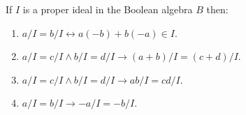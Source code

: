 If $I$ is a proper ideal in the Boolean algebra $B$ then:
\begin{enumerate}
\item $a/I = b/I \leftrightarrow a(-b) + b(-a) \in I$.
\item $a/I = c/I \land b/I = d/I \rightarrow (a + b)/I = (c + d)/I$.
\item $a/I = c/I \land b/I = d/I \rightarrow ab/I = cd/I$.
\item $a/I = b/I \rightarrow -a/I = -b/I$.
\end{enumerate}
